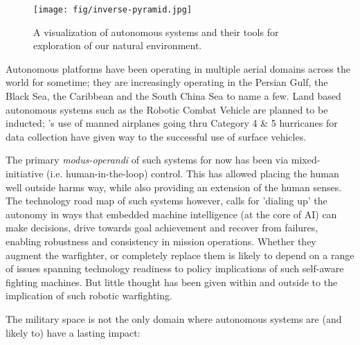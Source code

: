 \documentclass[11pt,letterpaper]{article}
\begin{document}
\begin{figure}  
  \centering 
  \texttt{[image: fig/inverse-pyramid.jpg]} 
  \caption{A visualization of autonomous systems and their tools for
    exploration of our natural environment.}
  \label{fig:inverse}
\end{figure}

Autonomous platforms have been operating in multiple aerial domains
across the world for sometime; they are increasingly operating in the
Persian Gulf, the Black Sea, the Caribbean and the South China Sea to
name a few. Land based autonomous systems such as the Robotic Combat Vehicle are
planned to be inducted; \noae's use of manned airplanes going thru
Category 4 \& 5 hurricanes for data collection have given way to the
successful use of  surface vehicles.

The primary \emph{modus-operandi} of such systems for now has been via
mixed-initiative (i.e. human-in-the-loop) control. This has allowed
placing the human well outside harms way, while also providing an
extension of the human senses. The technology road map of such systems
however, calls for 'dialing up' the autonomy in ways that embedded
machine intelligence (at the core of AI) can make decisions, drive
towards goal achievement and recover from failures, enabling robustness
and consistency in mission operations. Whether they augment the
warfighter, or completely replace them is likely to depend on a range
of issues spanning technology readiness to policy implications of such
self-aware fighting machines. But little thought has been given within
and outside \org to the implication of such robotic warfighting. 

\pagebreak

The military space is not the only domain where autonomous systems are
(and likely to) have a lasting impact:
\end{document}
